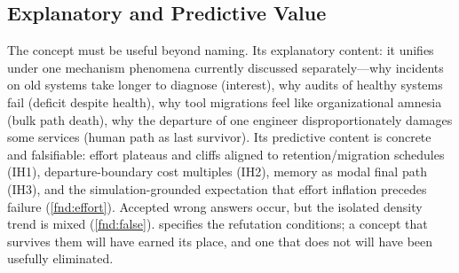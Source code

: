 \subsection{Explanatory and Predictive Value}
The concept must be useful beyond naming. Its explanatory content: it unifies
under one mechanism phenomena currently discussed separately---why incidents on
old systems take longer to diagnose (interest), why audits of healthy systems fail
(deficit despite health), why tool migrations feel like organizational amnesia
(bulk path death), why the departure of one engineer disproportionately damages
some services (human path as last survivor). Its predictive content is concrete
and falsifiable: effort plateaus and cliffs aligned to retention/migration schedules (IH1),
departure-boundary cost multiples (IH2), memory as modal final path (IH3), and
the simulation-grounded expectation that effort inflation precedes failure
(\cref{fnd:effort}). Accepted wrong answers occur, but the isolated density trend
is mixed (\cref{fnd:false}).  specifies the refutation
conditions; a concept that survives them will have earned its place, and one that
does not will have been usefully eliminated.

